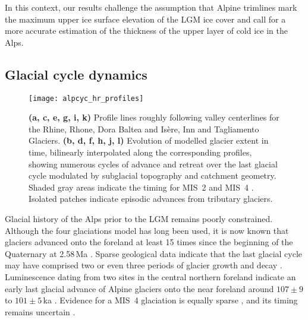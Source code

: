 \documentclass[tc, manuscript]{copernicus}
\begin{document}
    In this context, our results challenge the assumption that
    Alpine trimlines mark the maximum upper ice surface elevation of the LGM
    ice cover and call for a more accurate estimation of the thickness of the
    upper layer of cold ice in the Alps.


\subsection{Glacial cycle dynamics}
\label{sec:glaciations}

    \begin{figure*}[t]
      \centerline{\texttt{[image: alpcyc\_hr\_profiles]}}
      \caption{%
        \textbf{(a, c, e, g, i, k)} Profile lines roughly following valley
        centerlines for the Rhine, Rhone, Dora Baltea and Isère, Inn and
        Tagliamento Glaciers.
        \textbf{(b, d, f, h, j, l)} Evolution of modelled glacier extent in
        time, bilinearly interpolated along the corresponding profiles, showing
        numerous cycles of advance and retreat over the last glacial cycle
        modulated by subglacial topography and catchment geometry. Shaded gray
        areas indicate the timing for MIS~2 and MIS~4
        \citep{Lisiecki.Raymo.2005}. Isolated patches indicate episodic
        advances from tributary glaciers.}
      \label{fig:profiles}
    \end{figure*}

    Glacial history of the Alps prior to the LGM remains poorly constrained.
    Although the four glaciations model \citep{Penck.Bruckner.1909} has long
    been used, it is now known that glaciers advanced onto the foreland at
    least 15 times since the beginning of the Quaternary at 2.58\,Ma
    \citep{Schluchter.1991, Preusser.etal.2011}. Sparse geological
    data indicate that the last glacial cycle may have comprised two or even
    three periods of glacier growth and decay \citep{Preusser.2004, Ivy-Ochs.etal.2008}.
    Luminescence dating from two sites in the central northern foreland
    indicate an early last glacial advance of Alpine glaciers onto the near
    foreland around $107\pm9$ to $101\pm5$\,ka \citep{Preusser.etal.2003,
    Preusser.Schluchter.2004}. Evidence for a MIS~4 glaciation is equally
    sparse \citep[Sect.~\ref{sec:footprints};][]{Keller.Krayss.2010,
    Barrett.etal.2017, Haldimann.etal.2017}, and its timing remains uncertain
    \citep[e.g.,][]{Link.Preusser.2006, Preusser.etal.2007}.
\end{document}
